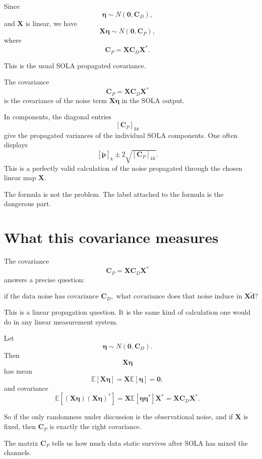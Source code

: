 \documentclass[11pt,openany]{book}
\theoremstyle{definition}
\theoremstyle{remark}
\begin{document}
Since
\[
  \boldsymbol\eta\sim N(\mathbf 0,\mathbf C_D),
\]
and \(\mathbf X\) is linear, we have
\[
  \mathbf X\boldsymbol\eta
  \sim
  N(\mathbf 0,\mathbf C_P),
\]
where
\[
  \mathbf C_P
  =
  \mathbf X\mathbf C_D\mathbf X^*.
\]

This is the usual SOLA propagated covariance.

\begin{checkpointbox}
The covariance
\[
  \mathbf C_P=\mathbf X\mathbf C_D\mathbf X^*
\]
is the covariance of the noise term \(\mathbf X\boldsymbol\eta\) in the SOLA output.
\end{checkpointbox}

In components, the diagonal entries
\[
  [\mathbf C_P]_{kk}
\]
give the propagated variances of the individual SOLA components. One often displays
\[
  [\widetilde{\mathbf p}]_k
  \pm
  2\sqrt{[\mathbf C_P]_{kk}}.
\]
This is a perfectly valid calculation of the noise propagated through the chosen linear map
\(\mathbf X\).

The formula is not the problem. The label attached to the formula is the dangerous part.

\section{What this covariance measures}

The covariance
\[
  \mathbf C_P
  =
  \mathbf X\mathbf C_D\mathbf X^*
\]
answers a precise question:

\[
  \text{if the data noise has covariance }\mathbf C_D,
  \text{ what covariance does that noise induce in }\mathbf X\widetilde{\mathbf d}?
\]

This is a linear propagation question. It is the same kind of calculation one would do in any
linear measurement system.

Let
\[
  \boldsymbol\eta
  \sim
  N(\mathbf 0,\mathbf C_D).
\]
Then
\[
  \mathbf X\boldsymbol\eta
\]
has mean
\[
  \mathbb E[\mathbf X\boldsymbol\eta]
  =
  \mathbf X\mathbb E[\boldsymbol\eta]
  =
  \mathbf 0,
\]
and covariance
\[
  \mathbb E
  \left[
    (\mathbf X\boldsymbol\eta)
    (\mathbf X\boldsymbol\eta)^*
  \right]
  =
  \mathbf X
  \mathbb E[\boldsymbol\eta\boldsymbol\eta^*]
  \mathbf X^*
  =
  \mathbf X\mathbf C_D\mathbf X^*.
\]

So if the only randomness under discussion is the observational noise, and if \(\mathbf X\) is
fixed, then \(\mathbf C_P\) is exactly the right covariance.

\begin{intuitionbox}
The matrix \(\mathbf C_P\) tells us how much data static survives after SOLA has mixed the
channels.
\end{intuitionbox}
\end{document}
